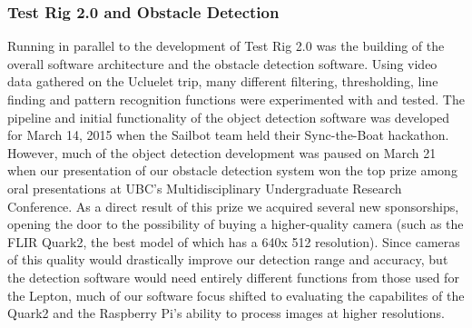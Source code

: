 \subsubsection{\label{sec:discussion:testing:testrig2}Test Rig 2.0 and Obstacle Detection}

Running in parallel to the development of Test Rig 2.0 was the building of the overall software architecture and the obstacle detection software. Using video data gathered on the Ucluelet trip, many different filtering, thresholding, line finding and pattern recognition functions were experimented with and tested. The pipeline and initial functionality of the object detection software was developed for March 14, 2015 when the Sailbot team held their Sync-the-Boat hackathon. However, much of the object detection development was paused on March 21 when our presentation of our obstacle detection system won the top prize among oral presentations at UBC's Multidisciplinary Undergraduate Research Conference. As a direct result of this prize we acquired several new sponsorships, opening the door to the possibility of buying a higher-quality camera (such as the FLIR Quark2, the best model of which has a 640x 512 resolution). Since cameras of this quality would drastically improve our detection range and accuracy, but the detection software would need entirely different functions from those used for the Lepton, much of our software focus shifted to evaluating the capabilites of the Quark2 and the Raspberry Pi's ability to process images at higher resolutions.

